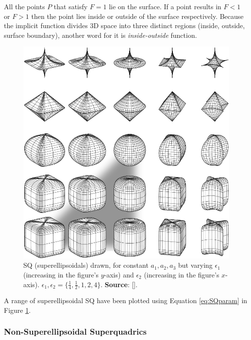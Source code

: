 All the points $P$ that satisfy $F=1$ lie on the surface. If a point results in $F < 1$ or $F > 1$ then the point lies inside or outside of the surface respectively. Because the implicit function divides 3D space into three distinct regions (inside, outside, surface boundary), another word for it is \textit{inside-outside} function. 

\begin{figure}[h]
	\centering
	\includegraphics[width=0.35\textheight]{import/SQ_ellipsoids}
	\caption{SQ (superellipsoidals) drawn, for constant $a_1, a_2, a_3$ but varying $\epsilon_1$ (increasing in the figure's $y$-axis) and $\epsilon_2$ (increasing in the figure's $x$-axis). $\epsilon_1,\epsilon_2 = \{\frac{1}{4}, \frac{1}{2}, 1, 2, 4\}$. \textbf{Source}: [\citeauthor{Kindlmann2004}].}
	\label{fig:SQ_ellipsoids}
\end{figure}

A range of superellipsoidal \gls{SQ} have been plotted using Equation \ref{eq:SQparam} in Figure \ref{fig:SQ_ellipsoids}.

\subsubsection*{Non-Superellipsoidal Superquadrics} \label{subsubsec:otherSQ}

